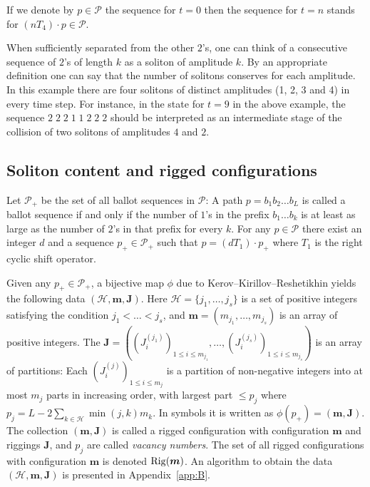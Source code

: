 \documentclass[pdftex]{sigma}
\newcommand{\Rig}{{\rm Rig}}
\newcommand{\Pth}{{\mathcal P}}
\newcommand{\m}{{\boldsymbol m}}
\newcommand{\boJ}{{\boldsymbol J}}
\renewcommand{\H}{{\mathcal H}}
\begin{document}
If we denote by $p \in {\mathcal P}$ the sequence for $t=0$ then the sequence for $t=n$ stands for
$(n T_4) \cdot p \in {\mathcal P}$.

When suf\/f\/iciently separated from the other $2$'s, one can think of
a consecutive sequence of $2$'s of length $k$ as a soliton of amplitude $k$.
By an appropriate def\/inition one can say that the number of solitons conserves for each amplitude.
In this example there are four solitons of distinct amplitudes (1, 2, 3 and 4) in every time step.
For instance, in the state for $t=9$ in the above example, the sequence $2\; 2\; 2\; 1\; 1\; 2\; 2\; 2$ should be interpreted as
an intermediate stage of the collision of two solitons of amplitudes $4$ and $2$.


\subsection{Soliton content and rigged conf\/igurations}\label{subsec:4_2}

Let
$\Pth_+$ be the set of all ballot sequences in $\Pth $: A path $p = b_1 b_2 \ldots b_L$ is called a ballot sequence if and only if
the number of $1$'s in the pref\/ix $b_1 \ldots b_k$ is at least as large as the number of $2$'s in that pref\/ix
for every $k$.
%
For any $p \in {\mathcal P}$ there exist an integer $d$ and a sequence $p_+ \in \Pth_+$ such that $p = (d T_1) \cdot p_+$
where $T_1$ is the right cyclic shift operator.

Given any $p_+ \in \Pth_+$, a bijective map $\phi$
due to Kerov--Kirillov--Reshetikhin \cite{KKR,KR}
yields the following data
$(\H, \m, \boJ)$.
Here $\H=\{ j_1,  \ldots ,j_s \}$ is a set of positive integers
satisfying the condition $j_1 < \dots < j_s$, and
$\m=( m_{j_1},\ldots,m_{j_s} )$ is an array of positive integers.
The
$\boJ = \left((J^{(j_1)}_i)_{1 \le i \le m_{j_1}}, \ldots,
(J^{(j_s)}_i)_{1 \le i \le m_{j_s}}\right)$
is an array of partitions:
Each $(J^{(j)}_i)_{1 \le i \le m_{j}}$ is a partition of non-negative integers into at most $m_j$ parts
in increasing order,
with largest part $\le p_j$
where
\begin{math}%
p_j = L - 2\sum_{k \in \H}\min(j,k)m_k.
\end{math}
In symbols it is written as $\phi (p_+) = (\m,\boJ)$.
The collection $(\m,\boJ)$ is called a rigged conf\/iguration with conf\/iguration $\m$ and
riggings $\boJ$, and $p_j$ are called \textit{vacancy numbers}.
The set of all rigged conf\/igurations with conf\/iguration $\m$ is denoted $\Rig(\m)$.
An algorithm to obtain the data
$(\H, \m, \boJ)$ is presented in Appendix~\ref{app:B}.
\end{document}

